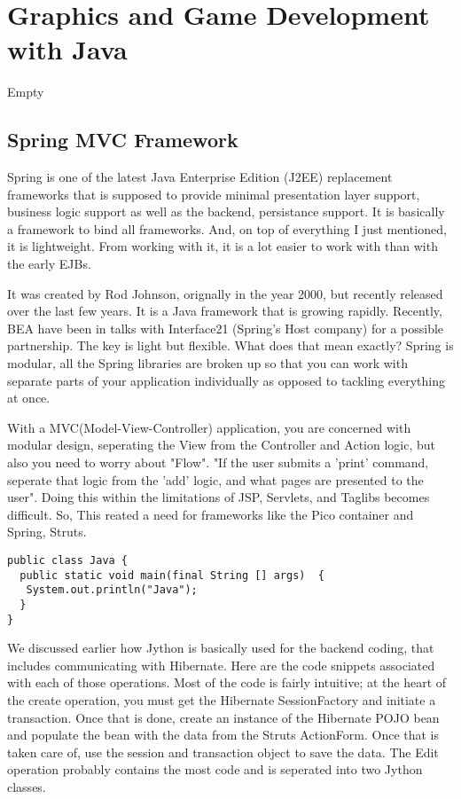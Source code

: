 \chapter{ Graphics and Game Development with Java }

Empty

\section{Spring MVC Framework}

Spring is one of the latest Java Enterprise Edition (J2EE) replacement 
frameworks that is supposed to provide minimal presentation layer support, 
business logic support as well as the backend, persistance support. 
It is basically a framework to bind all frameworks. And, on top 
of everything I just mentioned, it is lightweight. 
From working with it, it is a lot easier to work with than with the early EJBs.

It was created by Rod Johnson, orignally in the year 2000, but recently released over the last few years.
It is a Java framework that is growing rapidly. Recently, BEA have been in talks with
Interface21 (Spring's Host company) for a possible partnership. The key is light but flexible. What does
that mean exactly? Spring is modular, all the Spring libraries are broken up so that you can work with
separate parts of your application individually as opposed to tackling everything at once.

With a MVC(Model-View-Controller) application, you are concerned with modular design,
seperating the View from the Controller and Action logic, but also you need to worry about "Flow". "If
the user submits a 'print' command, seperate that logic from the 'add' logic, and what pages are
presented to the user". Doing this within the limitations of JSP, Servlets, and Taglibs becomes difficult.
So, This reated a need for frameworks like the Pico container and Spring, Struts. 

\begin{lstlisting}
public class Java {
  public static void main(final String [] args)  {
   System.out.println("Java");
  }
}
\end{lstlisting}

We discussed earlier how Jython is basically used for the backend 
coding, that includes communicating with Hibernate. 
Here are the code snippets associated with each of those operations. 
Most of the code is fairly intuitive; at the heart of the 
create operation, you must get the Hibernate SessionFactory 
and initiate a transaction. Once that is done, 
create an instance of the Hibernate POJO bean and populate 
the bean with the data from the Struts ActionForm. 
Once that is taken care of, use the session and transaction 
object to save the data. The Edit operation probably contains 
the most code and is seperated into two Jython classes.

